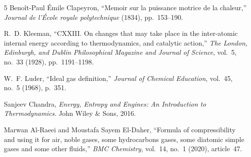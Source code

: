 \documentclass[12pt,letterpaper]{article}
\begin{document}
\begin{thebibliography}{5}
Beno\^it-Paul \'{E}mile Clapeyron, ``Memoir sur la puissance motrice de la chaleur,''
\textit{Journal de l'\'{E}cole royale polytechnique} (1834), pp.~153--190.

R.~D. Kleeman, ``CXXIII. On changes that may take place in the inter-atomic internal energy according to thermodynamics, and catalytic action,''
\textit{The London, Edinburgh, and Dublin Philosophical Magazine and Journal of Science},
vol.~5, no.~33 (1928), pp.~1191--1198.

W.~F. Luder, ``Ideal gas definition,'' \textit{Journal of Chemical Education},
vol.~45, no.~5 (1968), p.~351.

Sanjeev Chandra, \textit{Energy, Entropy and Engines: An Introduction to Thermodynamics}.
John Wiley \& Sons, 2016.

Marwan Al-Raeei and Moustafa Sayem El-Daher, ``Formula of compressibility and using it for air, noble gases, some hydrocarbons gases, some diatomic simple gases and some other fluids,''
\textit{BMC Chemistry}, vol.~14, no.~1 (2020), article~47.
\end{thebibliography}


\end{document}

